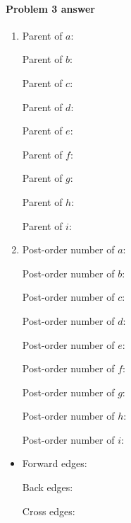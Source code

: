 \paragraph{Problem 3 answer} 

\begin{enumerate}[label=(\alph*)]\small

\item

  Parent of $a$: \BLUE{$
    \REPLACEME
    $}

  Parent of $b$: \BLUE{$
    \REPLACEME
    $}

  Parent of $c$: \BLUE{$
    \REPLACEME
    $}

  Parent of $d$: \BLUE{$
    \REPLACEME
    $}

  Parent of $e$: \BLUE{$
    \REPLACEME
    $}

  Parent of $f$: \BLUE{$
    \REPLACEME
    $}

  Parent of $g$: \BLUE{$
    \REPLACEME
    $}

  Parent of $h$: \BLUE{$
    \REPLACEME
    $}

  Parent of $i$: \BLUE{$
    \REPLACEME
    $}

\item

  Post-order number of $a$: \BLUE{$
    \REPLACEME
    $}

  Post-order number of $b$: \BLUE{$
    \REPLACEME
    $}

  Post-order number of $c$: \BLUE{$
    \REPLACEME
    $}

  Post-order number of $d$: \BLUE{$
    \REPLACEME
    $}

  Post-order number of $e$: \BLUE{$
    \REPLACEME
    $}

  Post-order number of $f$: \BLUE{$
    \REPLACEME
    $}

  Post-order number of $g$: \BLUE{$
    \REPLACEME
    $}

  Post-order number of $h$: \BLUE{$
    \REPLACEME
    $}

  Post-order number of $i$: \BLUE{$
    \REPLACEME
    $}

\end{enumerate}

\begin{itemize}
  
\item[(c)]

  Forward edges: \BLUE{$
    \REPLACEME
    $}

  Back  edges: \BLUE{$
    \REPLACEME
    $}

  Cross edges: \BLUE{$
    \REPLACEME
    $}

\end{itemize}

